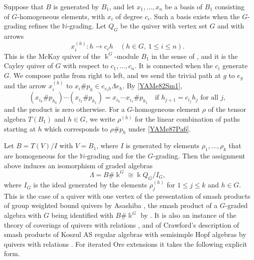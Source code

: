 \documentclass[reqno]{amsart}
\numberwithin{equation}{section}
\theoremstyle{definition}
\theoremstyle{remark}
\theoremstyle{plain}
\newcommand{\kk}{\Bbbk}
\begin{document}
Suppose that $B$ is generated by $B_1$, and let $x_1,\dots,x_n$ be a basis of $B_1$ consisting of $G$-homogeneous elements, with $x_i$ of degree $c_i$. Such a basis exists when the $G$-grading refines the $\mathbb N$-grading. Let $Q_G$ be the quiver with vertex set $G$ and with arrows
\[
x_i^{(h)}\colon h\longrightarrow c_ih\quad(h\in G,\ 1\le i\le n).
\]
This is the McKay quiver of the $\kk^G$-module $B_1$ in the sense of \cite{Cra22}, and it is the Cayley quiver of $G$ with respect to $c_1,\dots,c_n$. It is connected when the $c_i$ generate $G$. We compose paths from right to left, and we send the trivial path at $g$ to $e_g$ and the arrow $x_i^{(h)}$ to $x_i\#p_h\in e_{c_ih}\Lambda e_h$. By \eqref{YAMe82Sm1},
\begin{equation}\label{YAMe87Pa6}
(x_{i_k}\#p_{h_k})\cdots(x_{i_1}\#p_{h_1})=x_{i_k}\cdots x_{i_1}\#p_{h_1}\quad\text{if }h_{j+1}=c_{i_j}h_j\text{ for all }j,
\end{equation}
and the product is zero otherwise. For a $G$-homogeneous element $\rho$ of the tensor algebra $T(B_1)$ and $h\in G$, we write $\rho^{(h)}$ for the linear combination of paths starting at $h$ which corresponds to $\rho\#p_h$ under \eqref{YAMe87Pa6}.

Let $B=T(V)/I$ with $V=B_1$, where $I$ is generated by elements $\rho_1,\dots,\rho_k$ that are homogeneous for the $\mathbb N$-grading and for the $G$-grading. Then the assignment above induces an isomorphism of graded algebras
\begin{equation}\label{YAMe89Qr2}
\Lambda=B\#\kk^G\cong\kk Q_G/I_G,
\end{equation}
where $I_G$ is the ideal generated by the elements $\rho_j^{(h)}$ for $1\le j\le k$ and $h\in G$. This is the case of a quiver with one vertex of the presentation of smash products of group weighted bound quivers by Asashiba \cite[Theorem 1.18]{Asa}, the smash product of a $G$-graded algebra with $G$ being identified with $B\#\kk^G$ by \cite[Proposition 3.7]{CM2}. It is also an instance of the theory of coverings of quivers with relations \cite{Gre}, and of Crawford's description of smash products of Koszul AS regular algebras with semisimple Hopf algebras by quivers with relations \cite[Theorem 1.2]{Cra22}. For iterated Ore extensions it takes the following explicit form.
\end{document}
